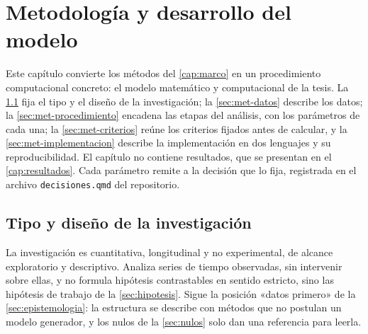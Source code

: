 \chapter{Metodología y desarrollo del modelo}
\label{cap:metodologia}

Este capítulo convierte los métodos del \cref{cap:marco} en un procedimiento computacional
concreto: el modelo matemático y computacional de la tesis. La \cref{sec:met-diseno} fija el tipo
y el diseño de la investigación; la \cref{sec:met-datos} describe los datos; la
\cref{sec:met-procedimiento} encadena las etapas del análisis, con los parámetros de cada una; la
\cref{sec:met-criterios} reúne los criterios fijados antes de calcular, y la
\cref{sec:met-implementacion} describe la implementación en dos lenguajes y su reproducibilidad.
El capítulo no contiene resultados, que se presentan en el \cref{cap:resultados}. Cada parámetro
remite a la decisión que lo fija, registrada en el archivo \texttt{decisiones.qmd} del
repositorio.

\section{Tipo y diseño de la investigación}
\label{sec:met-diseno}

La investigación es cuantitativa, longitudinal y no experimental, de alcance exploratorio y
descriptivo. Analiza series de tiempo observadas, sin intervenir sobre ellas, y no formula
hipótesis contrastables en sentido estricto, sino las hipótesis de trabajo de la
\cref{sec:hipotesis}. Sigue la posición «datos primero» de la \cref{sec:epistemologia}: la
estructura se describe con métodos que no postulan un modelo generador, y los nulos de la
\cref{sec:nulos} solo dan una referencia para leerla.

